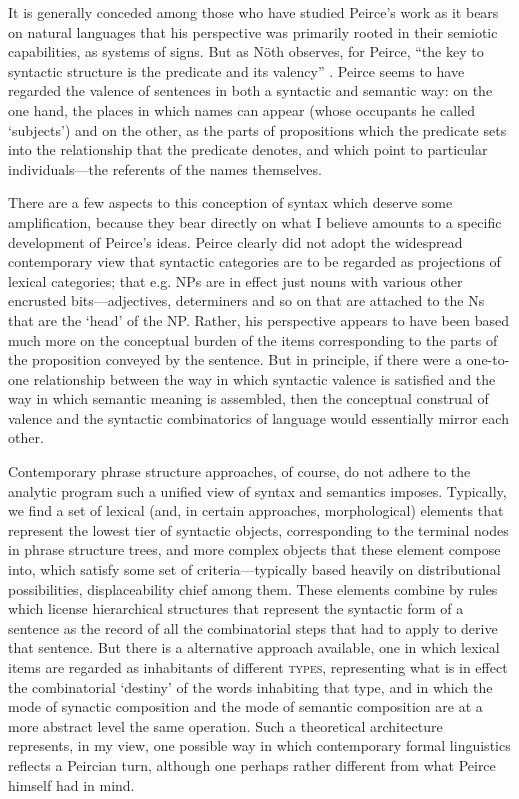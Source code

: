 \documentclass[output=paper,colorlinks,citecolor=brown]{langscibook}
\begin{document}
It is generally conceded among those who have studied Peirce's work as
it bears on natural languages that his perspective was primarily
rooted in their semiotic capabilities, as systems of signs. But as
Nöth observes, for Peirce, ``the key to syntactic structure is the
predicate and its valency'' \citeyearpar[7]{nothPeirce}. Peirce
seems to have regarded the valence of sentences in both a syntactic
and semantic way: on the one hand, the places in which names can
appear (whose occupants he called `subjects') and on the other, as the
parts of propositions which the predicate sets into the relationship
that the predicate denotes, and which point to particular
individuals---the referents of the names themselves.

There are a few aspects to this conception of syntax which deserve
some amplification, because they bear directly on what I believe
amounts to a specific development of Peirce's ideas. Peirce clearly
did not adopt the widespread contemporary view that syntactic
categories are to be regarded as projections of lexical categories;
that e.g. NPs are in effect just nouns with various other encrusted
bits---adjectives, determiners and so on that are attached to the Ns
that are the `head' of the NP. Rather, his perspective appears to have been
based much more on the conceptual burden of the items corresponding to
the parts of the proposition conveyed by the sentence. But in
principle, if there were a one-to-one relationship between the way in
which syntactic valence is satisfied and the way in which semantic
meaning is assembled, then the conceptual construal of valence and the
syntactic combinatorics of language would essentially mirror each
other.

Contemporary phrase structure approaches, of course, do not adhere to
the analytic program such a unified view of syntax and semantics
imposes. Typically, we find a set of lexical (and, in certain
approaches, morphological) elements that represent the lowest tier of
syntactic objects, corresponding to the terminal nodes in phrase
structure trees, and more complex objects that these element compose
into, which satisfy some set of criteria---typically based heavily on
distributional possibilities, displaceability chief among them. These
elements combine by rules which license hierarchical structures that
represent the syntactic form of a sentence as the record of all the
combinatorial steps that had to apply to derive that sentence.  But
there is a alternative approach available, one in which lexical items
are regarded as inhabitants of different \textsc{types}, representing what
is in effect the combinatorial `destiny' of the words inhabiting that
type, and in which the mode of synactic composition and the mode of
semantic composition are at a more abstract level the same
operation. Such a theoretical architecture represents, in my view, one
possible way in which contemporary formal linguistics reflects a
Peircian turn, although one perhaps rather different from what Peirce
himself had in mind.
\end{document}
